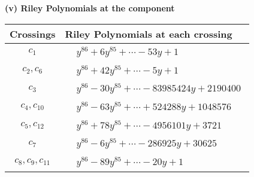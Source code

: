\documentclass[1p]{elsarticle_modified}
\theoremstyle{definition}
\begin{document}
\newpage\renewcommand{\arraystretch}{1}
\flushleft \textbf{(v) Riley Polynomials at the component}\newline \\
\begin{tabular}{m{50pt}|m{274pt}}
Crossings & \hspace{64pt}Riley Polynomials at each crossing \\
\hline $$\begin{aligned}c_{1}\end{aligned}$$&$\begin{aligned}
&y^{86}+6 y^{85}+\cdots-53 y+1
\end{aligned}$\\
\hline $$\begin{aligned}c_{2},c_{6}\end{aligned}$$&$\begin{aligned}
&y^{86}+42 y^{85}+\cdots-5 y+1
\end{aligned}$\\
\hline $$\begin{aligned}c_{3}\end{aligned}$$&$\begin{aligned}
&y^{86}-30 y^{85}+\cdots-83985424 y+2190400
\end{aligned}$\\
\hline $$\begin{aligned}c_{4},c_{10}\end{aligned}$$&$\begin{aligned}
&y^{86}-63 y^{85}+\cdots+524288 y+1048576
\end{aligned}$\\
\hline $$\begin{aligned}c_{5},c_{12}\end{aligned}$$&$\begin{aligned}
&y^{86}+78 y^{85}+\cdots-4956101 y+3721
\end{aligned}$\\
\hline $$\begin{aligned}c_{7}\end{aligned}$$&$\begin{aligned}
&y^{86}-6 y^{85}+\cdots-286925 y+30625
\end{aligned}$\\
\hline $$\begin{aligned}c_{8},c_{9},c_{11}\end{aligned}$$&$\begin{aligned}
&y^{86}-89 y^{85}+\cdots-20 y+1
\end{aligned}$\\
\hline
\end{tabular}\\~\\
\end{document}
